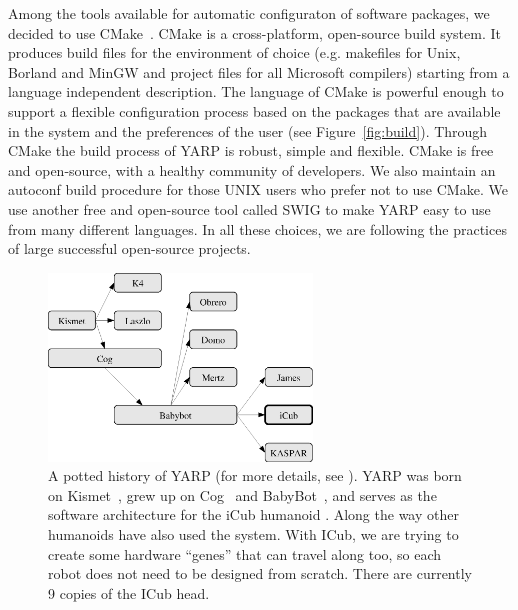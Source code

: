 Among the tools available for automatic configuraton of 
software packages, we decided to use CMake~\cite{cmake}.
CMake is a cross-platform, open-source build system. It 
produces build files for the environment of choice (e.g. 
makefiles for Unix, Borland and MinGW and project files for 
all Microsoft compilers) starting from a language independent 
description. The language of CMake is powerful enough
to support a flexible configuration process based 
on the packages that are available in the system and 
the preferences of the user (see Figure~\ref{fig:build}). Through 
CMake the build process of YARP is robust, simple and 
flexible.
%
%
%
CMake is free and open-source, with a healthy community of 
developers.
%
We also maintain an autoconf build procedure for those UNIX users
who prefer not to use CMake.
%
We use another free and open-source tool called SWIG to make
YARP easy to use from many different languages.
%
In all these choices, we are following the practices of
large successful open-source projects.



\begin{figure}[t]
\begin{center}
\includegraphics[height=5cm]{fig-family}
\caption{
%
\label{fig:family}
%
A potted history of YARP (for more details, see \cite{metta2006yarp}).  YARP was born on Kismet~\cite{breazeal01active},
grew up on Cog~\cite{brooks99cog} and 
BabyBot~\cite{natale05linking}, and serves as the
software architecture for the iCub humanoid \cite{tsagarakis2007icub}.
%
Along the way other humanoids have also used the system.
%
With ICub, we are trying to create some hardware ``genes''
that can travel along too, so each robot does not need to
be designed from scratch.
%
There are currently 9 copies of the ICub head.
%
%
}
\end{center}
\end{figure}



